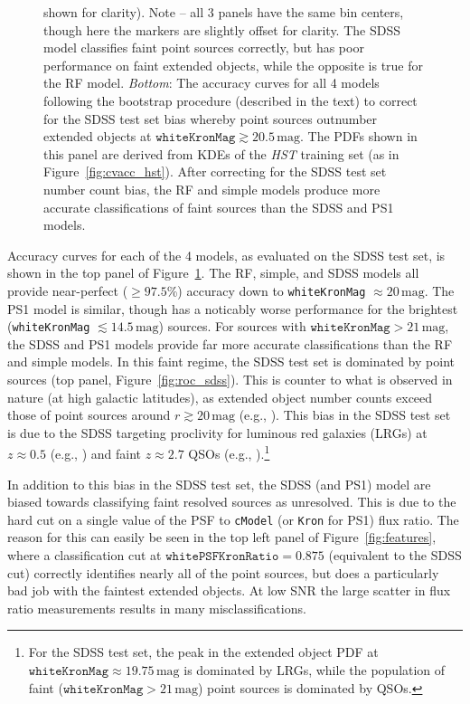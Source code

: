 \documentclass[twocolumn]{aastex62}
\begin{document}
\begin{CJK*}{UTF8}{gbsn}
\begin{figure}[htb]
{  shown for clarity). Note -- all 3 panels have the same bin centers, though
  here the markers are slightly offset for clarity. The SDSS model
  classifies faint point sources correctly, but has poor performance on
  faint extended objects, while the opposite is true for the RF model.
  \textit{Bottom}: The accuracy curves for all 4 models following the
  bootstrap procedure (described in the text) to correct for the SDSS test
  set bias whereby point sources outnumber extended objects at
  $\mathtt{whiteKronMag} \gtrsim 20.5\,\mathrm{mag}$. The PDFs shown in this
  panel are derived from KDEs of the \textit{HST} training set (as in
  Figure~\ref{fig:cvacc_hst}). After correcting for the SDSS test set number
  count bias, the RF and simple models produce more accurate classifications
  of faint sources than the SDSS and PS1 models.}
  \label{fig:acc_sdss}
\end{figure}

Accuracy curves for each of the 4 models, as evaluated on the SDSS test set,
is shown in the top panel of Figure~\ref{fig:acc_sdss}. The RF, simple, and
SDSS models all provide near-perfect ($\ge 97.5$\%) accuracy down to
\texttt{whiteKronMag} $\approx 20\,\mathrm{mag}$. The PS1 model is similar,
though has a noticably worse performance for the brightest
(\texttt{whiteKronMag} $\lesssim 14.5\,\mathrm{mag}$) sources. For sources
with $\mathtt{whiteKronMag} > 21\,\mathrm{mag}$, the SDSS and PS1 models
provide far more accurate classifications than the RF and simple models. In
this faint regime, the SDSS test set is dominated by point sources (top
panel, Figure~\ref{fig:roc_sdss}). This is counter to what is observed in
nature (at high galactic latitudes), as extended object number counts exceed
those of point sources around $r \gtrsim 20\,\mathrm{mag}$ (e.g.,
\citealt{Yasuda01,Shanks15}). This bias in the SDSS test set is due to the
SDSS targeting proclivity for luminous red galaxies (LRGs) at $z \approx
0.5$ (e.g., \citealt{Eisenstein01}) and faint $z \approx 2.7$ QSOs (e.g.,
\citealt{Ross12}).\footnote{For the SDSS test set, the peak in the extended
object PDF at $\mathtt{whiteKronMag} \approx 19.75\,\mathrm{mag}$ is
dominated by LRGs, while the population of faint ($\mathtt{whiteKronMag} >
21\,\mathrm{mag}$) point sources is dominated by QSOs.}

In addition to this bias in the SDSS test set, the SDSS (and PS1) model are
biased towards classifying faint resolved sources as unresolved. This is due
to the hard cut on a single value of the PSF to \texttt{cModel} (or
\texttt{Kron} for PS1) flux ratio. The reason for this can easily be seen in
the top left panel of Figure~\ref{fig:features}, where a classification cut
at $\mathtt{whitePSFKronRatio} = 0.875$ (equivalent to the SDSS cut)
correctly identifies nearly all of the point sources, but does a
particularly bad job with the faintest extended objects. At low SNR the
large scatter in flux ratio measurements results in many misclassifications.


\end{CJK*}
\end{document}
